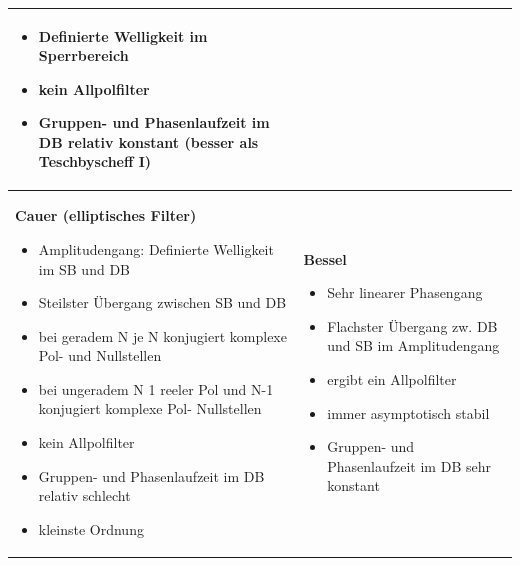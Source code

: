 \begin{tabular}{|p{9cm}|p{9cm}|}
{	\begin{itemize}
    \item Definierte Welligkeit im Sperrbereich
    \item kein Allpolfilter
    \item Gruppen- und Phasenlaufzeit im DB relativ konstant \newline
          (besser als Teschbyscheff I)
	\end{itemize}
	} \\
\hline
\parbox[t]{6cm}{
	\textbf{Cauer (elliptisches Filter)} 
	\begin{itemize}
    \item Amplitudengang: Definierte Welligkeit im SB und DB
    \item Steilster Übergang zwischen SB und DB
    \item bei geradem N je N konjugiert komplexe Pol- und Nullstellen
    \item bei ungeradem N 1 reeler Pol und N-1 konjugiert komplexe Pol- Nullstellen
    \item kein Allpolfilter
    \item Gruppen- und Phasenlaufzeit im DB relativ schlecht
    \item kleinste Ordnung
	\end{itemize}
	}
& 
\parbox[t]{6cm}{
	\textbf{Bessel} 
	\begin{itemize}
    \item Sehr linearer Phasengang
    \item Flachster Übergang zw. DB und SB im Amplitudengang
    \item ergibt ein Allpolfilter
    \item immer asymptotisch stabil
    \item Gruppen- und Phasenlaufzeit im DB sehr konstant
	\end{itemize}
	} \\
\hline
\end{tabular}
\vfill

